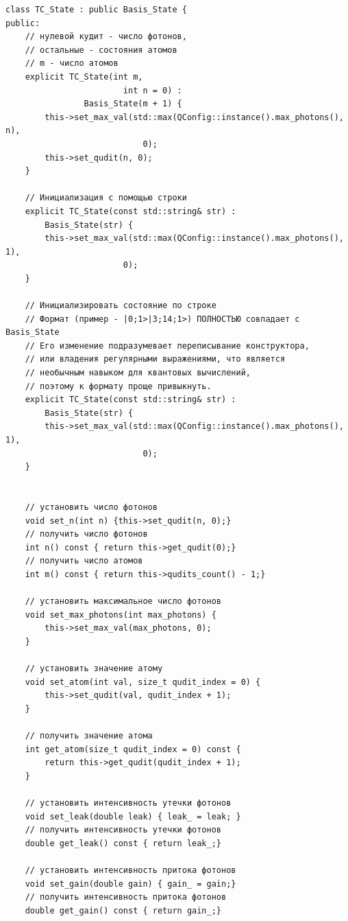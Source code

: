 \documentclass[12pt,fleqn]{article}
\begin{document}
\begin{mdframed}[linecolor=black, topline=true, bottomline=true,
leftline=false, rightline=false]
\begin{verbatim}
class TC_State : public Basis_State {
public:
    // нулевой кудит - число фотонов,
    // остальные - состояния атомов
    // m - число атомов
    explicit TC_State(int m,
                        int n = 0) :
                Basis_State(m + 1) {
        this->set_max_val(std::max(QConfig::instance().max_photons(), n),
                            0);
        this->set_qudit(n, 0);
    }

    // Инициализация с помощью строки
    explicit TC_State(const std::string& str) :
        Basis_State(str) {
        this->set_max_val(std::max(QConfig::instance().max_photons(), 1),
                        0);
    }

    // Инициализировать состояние по строке
    // Формат (пример - |0;1>|3;14;1>) ПОЛНОСТЬЮ совпадает с Basis_State
    // Его изменение подразумевает переписывание конструктора, 
    // или владения регулярными выражениями, что является 
    // необычным навыком для квантовых вычислений, 
    // поэтому к формату проще привыкнуть.
    explicit TC_State(const std::string& str) :
        Basis_State(str) {
        this->set_max_val(std::max(QConfig::instance().max_photons(), 1),
                            0);
    }


    // установить число фотонов
    void set_n(int n) {this->set_qudit(n, 0);}
    // получить число фотонов
    int n() const { return this->get_qudit(0);}
    // получить число атомов
    int m() const { return this->qudits_count() - 1;}

    // установить максимальное число фотонов
    void set_max_photons(int max_photons) {
        this->set_max_val(max_photons, 0);    
    }

    // установить значение атому
    void set_atom(int val, size_t qudit_index = 0) { 
        this->set_qudit(val, qudit_index + 1);
    }

    // получить значение атома
    int get_atom(size_t qudit_index = 0) const { 
        return this->get_qudit(qudit_index + 1);
    }

    // установить интенсивность утечки фотонов
    void set_leak(double leak) { leak_ = leak; }
    // получить интенсивность утечки фотонов
    double get_leak() const { return leak_;}

    // установить интенсивность притока фотонов
    void set_gain(double gain) { gain_ = gain;}
    // получить интенсивность притока фотонов
    double get_gain() const { return gain_;}


\end{verbatim}
\end{mdframed}
\end{document}
